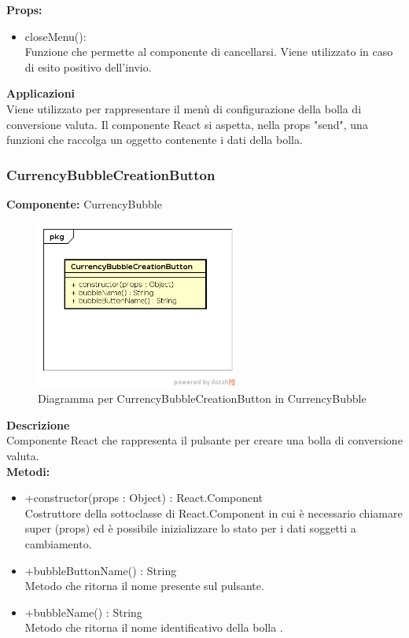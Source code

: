 \textbf{Props:} 
\begin{itemize}
\item closeMenu(): 
\\
Funzione che permette al componente di cancellarsi. Viene utilizzato in caso di esito positivo dell'invio.


\end{itemize} 


\textbf{Applicazioni}\\
Viene utilizzato per rappresentare il menù di configurazione della bolla di conversione valuta. Il componente React si aspetta, nella props "send", una funzioni che raccolga un oggetto contenente i dati della bolla. 


\clearpage

\subsubsection{CurrencyBubbleCreationButton}
\textbf{Componente:}  CurrencyBubble\\
   \FloatBarrier
   \begin{figure}[ht]
   \centering
   \includegraphics[width=0.6\textwidth]{img/single-CurrencyBubbleCreationButton.png}
   \caption{{Diagramma per CurrencyBubbleCreationButton in CurrencyBubble}}
\end{figure}
\FloatBarrier
\textbf{Descrizione}\\
Componente React che rappresenta il pulsante per creare una bolla di conversione valuta.
\\
\textbf{Metodi:} 
\begin{itemize}
\item +constructor(props : Object) : React.Component 
\\
Costruttore della sottoclasse di React.Component in cui è necessario chiamare super (props) ed è possibile inizializzare lo stato per i dati soggetti a cambiamento.

\item +bubbleButtonName() : String 
\\
Metodo che ritorna il nome presente sul pulsante.

\item +bubbleName() : String 
\\
Metodo che ritorna il nome identificativo della bolla .

\end{itemize}

